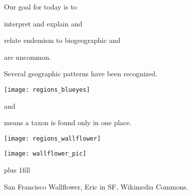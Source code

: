 \documentclass[t]{beamer}
\begin{document}

\begin{frame}[t,plain]{Our goal for today is to }

	\hangpara interpret and explain  and
	
	\hangpara relate endemism to biogeographic  and 
	
\end{frame}


{
\begin{frame}[b,plain]{ are uncommon.}

\end{frame}
}




\begin{frame}[t,plain]{Several geographic patterns have been recognized.}
\begin{multicols}{2}

	\noindent\texttt{[image: regions\_blueyes]}

	\columnbreak
	
	\hangpara{}
	
	\hangpara{}
	
	\hangpara{} and

	\hangpara{}

\end{multicols}
\end{frame}

\begin{frame}[t,plain]{ means a taxon is found only in one place.}
\begin{multicols}{2}

	\texttt{[image: regions\_wallflower]}

	\columnbreak
	
	\hfil\texttt{[image: wallflower\_pic]}\hfill

	\vfill
		
\end{multicols}

	\vskip0pt plus 1fill
	
	\tiny\hfill San Francisco Wallflower, Eric in SF, Wikimedia Commons.

\end{frame}
\end{document}
